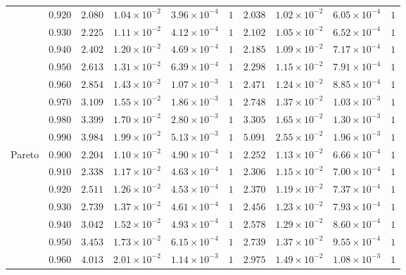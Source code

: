 \begin{table}[ht]
{\begin{tabular}{cc|cccc|cccc}
&$0.920$ & $2.080$ & $1.04\times 10^{-2}$ & $3.96\times 10^{-4}$ & $ 1$ & $2.038$ & $1.02\times 10^{-2}$ & $6.05\times 10^{-4}$ & $ 1$\\
&$0.930$ & $2.225$ & $1.11\times 10^{-2}$ & $4.12\times 10^{-4}$ & $ 1$ & $2.102$ & $1.05\times 10^{-2}$ & $6.52\times 10^{-4}$ & $ 1$\\
&$0.940$ & $2.402$ & $1.20\times 10^{-2}$ & $4.69\times 10^{-4}$ & $ 1$ & $2.185$ & $1.09\times 10^{-2}$ & $7.17\times 10^{-4}$ & $ 1$\\
&$0.950$ & $2.613$ & $1.31\times 10^{-2}$ & $6.39\times 10^{-4}$ & $ 1$ & $2.298$ & $1.15\times 10^{-2}$ & $7.91\times 10^{-4}$ & $ 1$\\
&$0.960$ & $2.854$ & $1.43\times 10^{-2}$ & $1.07\times 10^{-3}$ & $ 1$ & $2.471$ & $1.24\times 10^{-2}$ & $8.85\times 10^{-4}$ & $ 1$\\
&$0.970$ & $3.109$ & $1.55\times 10^{-2}$ & $1.86\times 10^{-3}$ & $ 1$ & $2.748$ & $1.37\times 10^{-2}$ & $1.03\times 10^{-3}$ & $ 1$\\
&$0.980$ & $3.399$ & $1.70\times 10^{-2}$ & $2.80\times 10^{-3}$ & $ 1$ & $3.305$ & $1.65\times 10^{-2}$ & $1.30\times 10^{-3}$ & $ 1$\\
&$0.990$ & $3.984$ & $1.99\times 10^{-2}$ & $5.13\times 10^{-3}$ & $ 1$ & $5.091$ & $2.55\times 10^{-2}$ & $1.96\times 10^{-3}$ & $ 1$\\\hline 
\multirow{10}{*}{Pareto}&$0.900$ & $2.204$ & $1.10\times 10^{-2}$ & $4.90\times 10^{-4}$ & $ 1$ & $2.252$ & $1.13\times 10^{-2}$ & $6.66\times 10^{-4}$ & $ 1$\\
&$0.910$ & $2.338$ & $1.17\times 10^{-2}$ & $4.63\times 10^{-4}$ & $ 1$ & $2.306$ & $1.15\times 10^{-2}$ & $7.00\times 10^{-4}$ & $ 1$\\
&$0.920$ & $2.511$ & $1.26\times 10^{-2}$ & $4.53\times 10^{-4}$ & $ 1$ & $2.370$ & $1.19\times 10^{-2}$ & $7.37\times 10^{-4}$ & $ 1$\\
&$0.930$ & $2.739$ & $1.37\times 10^{-2}$ & $4.61\times 10^{-4}$ & $ 1$ & $2.456$ & $1.23\times 10^{-2}$ & $7.93\times 10^{-4}$ & $ 1$\\
&$0.940$ & $3.042$ & $1.52\times 10^{-2}$ & $4.93\times 10^{-4}$ & $ 1$ & $2.578$ & $1.29\times 10^{-2}$ & $8.60\times 10^{-4}$ & $ 1$\\
&$0.950$ & $3.453$ & $1.73\times 10^{-2}$ & $6.15\times 10^{-4}$ & $ 1$ & $2.739$ & $1.37\times 10^{-2}$ & $9.55\times 10^{-4}$ & $ 1$\\
&$0.960$ & $4.013$ & $2.01\times 10^{-2}$ & $1.14\times 10^{-3}$ & $ 1$ & $2.975$ & $1.49\times 10^{-2}$ & $1.08\times 10^{-3}$ & $ 1$\\

\end{tabular}}
\end{table}

